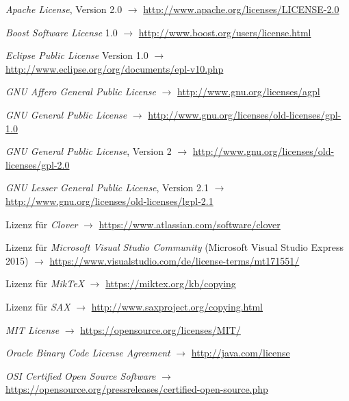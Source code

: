\documentclass[english,ngerman,parskip=half,headsepline,footsepline]{scrreprt}
\begin{document}
   	\begin{flushleft}
		\begin{thebibliography}{12}
			\thispagestyle{scrheadings}			
        	
			\emph{Apache License}, Version 2.0 $\rightarrow$ \url{http://www.apache.org/licenses/LICENSE-2.0}
			
			\emph{Boost Software License} 1.0 $\rightarrow$ \url{http://www.boost.org/users/license.html}
			
			\emph{Eclipse Public License} Version 1.0 $\rightarrow$ \url{http://www.eclipse.org/org/documents/epl-v10.php}
			
			\emph{GNU Affero General Public License} $\rightarrow$ \url{http://www.gnu.org/licenses/agpl}
			
			\emph{GNU General Public License} $\rightarrow$ \url{http://www.gnu.org/licenses/old-licenses/gpl-1.0}
			
			\emph{GNU General Public License}, Version 2 $\rightarrow$ \url{http://www.gnu.org/licenses/old-licenses/gpl-2.0}
			
			\emph{GNU Lesser General Public License}, Version 2.1 $\rightarrow$ \url{http://www.gnu.org/licenses/old-licenses/lgpl-2.1}
			
			Lizenz für \emph{Clover} $\rightarrow$ \url{https://www.atlassian.com/software/clover}
			
			Lizenz für \emph{Microsoft Visual Studio Community} (Microsoft Visual Studio Express 2015) $\rightarrow$ \url{https://www.visualstudio.com/de/license-terms/mt171551/}
			
			Lizenz für \emph{MikTeX} $\rightarrow$ \url{https://miktex.org/kb/copying}
				
			Lizenz für \emph{SAX} $\rightarrow$ \url{http://www.saxproject.org/copying.html}
			
			\emph{MIT License} $\rightarrow$ \url{https://opensource.org/licenses/MIT/}
			
			\emph{Oracle Binary Code License Agreement} $\rightarrow$ \url{http://java.com/license}
		
			\emph{OSI Certified Open Source Software} $\rightarrow$ \url{https://opensource.org/pressreleases/certified-open-source.php}
			

\end{thebibliography}
\end{flushleft}
\end{document}
